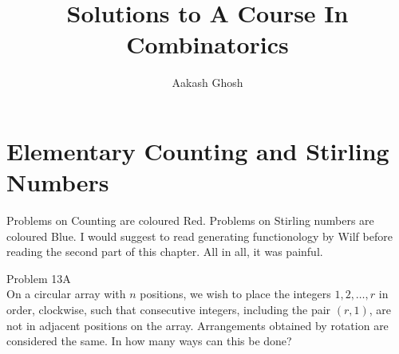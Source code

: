 \documentclass{tufte-book}
\title{Solutions to A Course In Combinatorics}
\author[Aakash Ghosh]{Aakash Ghosh}
\begin{document}
\maketitle


\tableofcontents

\mainmatter

















\chapter{Elementary Counting  and
Stirling Numbers}
\begin{fullwidth}
	Problems on Counting are coloured Red. Problems on Stirling numbers are coloured Blue. I would suggest to read generating functionology by Wilf before reading the second part of this chapter. All in all, it was painful.
\end{fullwidth}
\begin{tcolorbox}[colback=red!5!white]
\large{Problem 13A}\\
On a circular array with $n$ positions, we wish to
place the integers $1, 2,\hdots,r$ in order, clockwise, such that consecutive integers, including the pair $(r, 1)$, are not in adjacent positions
on the array. Arrangements obtained by rotation are considered
the same. In how many ways can this be done?
\end{tcolorbox}
\end{document}
